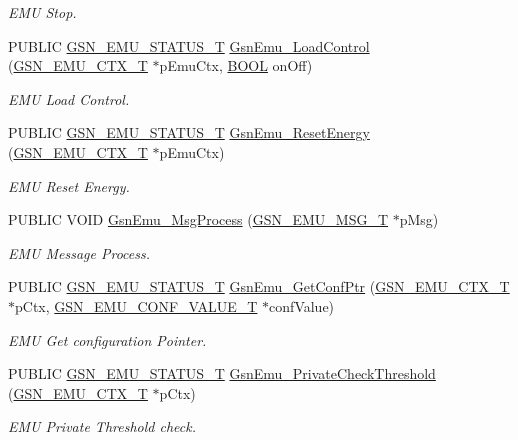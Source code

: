 \begin{DoxyCompactItemize}
\begin{DoxyCompactList}\small\item\em EMU Stop. \end{DoxyCompactList}\item 
PUBLIC \hyperlink{a00490_aeda27e2bd7f74b1b9748e313d272033e}{GSN\_\-EMU\_\-STATUS\_\-T} \hyperlink{a00663_gacd69f0f8577c5a31988349642ce6b512}{GsnEmu\_\-LoadControl} (\hyperlink{a00059}{GSN\_\-EMU\_\-CTX\_\-T} $\ast$pEmuCtx, \hyperlink{a00660_ga1f04022c0a182c51c059438790ea138c}{BOOL} onOff)
\begin{DoxyCompactList}\small\item\em EMU Load Control. \end{DoxyCompactList}\item 
PUBLIC \hyperlink{a00490_aeda27e2bd7f74b1b9748e313d272033e}{GSN\_\-EMU\_\-STATUS\_\-T} \hyperlink{a00663_ga5b8064675bb056aaa15341a826269048}{GsnEmu\_\-ResetEnergy} (\hyperlink{a00059}{GSN\_\-EMU\_\-CTX\_\-T} $\ast$pEmuCtx)
\begin{DoxyCompactList}\small\item\em EMU Reset Energy. \end{DoxyCompactList}\item 
PUBLIC VOID \hyperlink{a00663_gafe8f6ed1a40411f25e8564d98435ffa8}{GsnEmu\_\-MsgProcess} (\hyperlink{a00062}{GSN\_\-EMU\_\-MSG\_\-T} $\ast$pMsg)
\begin{DoxyCompactList}\small\item\em EMU Message Process. \end{DoxyCompactList}\item 
PUBLIC \hyperlink{a00490_aeda27e2bd7f74b1b9748e313d272033e}{GSN\_\-EMU\_\-STATUS\_\-T} \hyperlink{a00663_ga3ab0982e59d704aec080c1752221c1ec}{GsnEmu\_\-GetConfPtr} (\hyperlink{a00059}{GSN\_\-EMU\_\-CTX\_\-T} $\ast$pCtx, \hyperlink{a00058}{GSN\_\-EMU\_\-CONF\_\-VALUE\_\-T} $\ast$confValue)
\begin{DoxyCompactList}\small\item\em EMU Get configuration Pointer. \end{DoxyCompactList}\item 
PUBLIC \hyperlink{a00490_aeda27e2bd7f74b1b9748e313d272033e}{GSN\_\-EMU\_\-STATUS\_\-T} \hyperlink{a00663_ga898954cb12a09a8b232591d909aa3f93}{GsnEmu\_\-PrivateCheckThreshold} (\hyperlink{a00059}{GSN\_\-EMU\_\-CTX\_\-T} $\ast$pCtx)
\begin{DoxyCompactList}\small\item\em EMU Private Threshold check. \end{DoxyCompactList}\end{DoxyCompactItemize}


